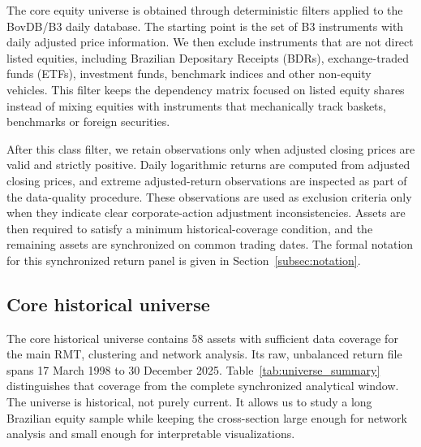 The core equity universe is obtained through deterministic filters applied to the BovDB/B3 daily database. The starting point is the set of B3 instruments with daily adjusted price information. We then exclude instruments that are not direct listed equities, including Brazilian Depositary Receipts (BDRs), exchange-traded funds (ETFs), investment funds, benchmark indices and other non-equity vehicles. This filter keeps the dependency matrix focused on listed equity shares instead of mixing equities with instruments that mechanically track baskets, benchmarks or foreign securities.

After this class filter, we retain observations only when adjusted closing prices are valid and strictly positive. Daily logarithmic returns are computed from adjusted closing prices, and extreme adjusted-return observations are inspected as part of the data-quality procedure. These observations are used as exclusion criteria only when they indicate clear corporate-action adjustment inconsistencies. Assets are then required to satisfy a minimum historical-coverage condition, and the remaining assets are synchronized on common trading dates. The formal notation for this synchronized return panel is given in Section~\ref{subsec:notation}.

\subsection{Core historical universe}

The core historical universe contains 58 assets with sufficient data coverage for the main RMT, clustering and network analysis. Its raw, unbalanced return file spans 17 March 1998 to 30 December 2025. Table~\ref{tab:universe_summary} distinguishes that coverage from the complete synchronized analytical window. The universe is historical, not purely current. It allows us to study a long Brazilian equity sample while keeping the cross-section large enough for network analysis and small enough for interpretable visualizations.

\begin{center}
\label{tab:universe_summary}
\end{center}

